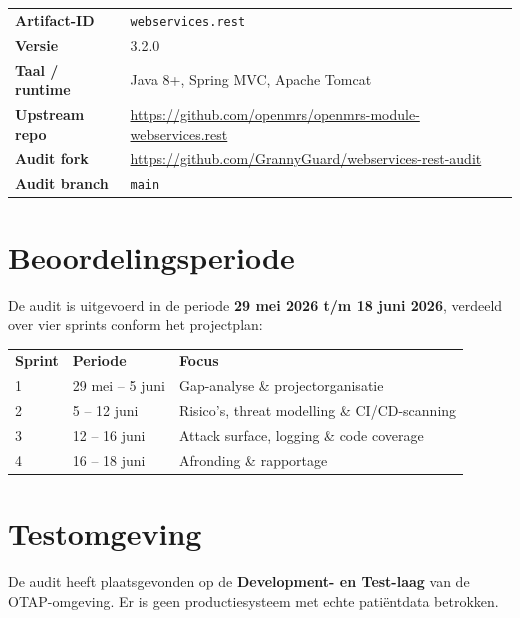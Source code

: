 \documentclass[12pt, a4paper]{report}
\begin{document}
\begin{tabular}{@{}ll}
    \textbf{Artifact-ID}    & \texttt{webservices.rest} \\[4pt]
    \textbf{Versie}         & 3.2.0 \\[4pt]
    \textbf{Taal / runtime} & Java 8+, Spring MVC, Apache Tomcat \\[4pt]
    \textbf{Upstream repo}  & \url{https://github.com/openmrs/openmrs-module-webservices.rest} \\[4pt]
    \textbf{Audit fork}     & \url{https://github.com/GrannyGuard/webservices-rest-audit} \\[4pt]
    \textbf{Audit branch}   & \texttt{main} \\
\end{tabular}

\section{Beoordelingsperiode}
\label{sec:periode}

De audit is uitgevoerd in de periode \textbf{29 mei 2026 t/m 18 juni 2026},
verdeeld over vier sprints conform het projectplan:

\begin{tabular}{@{}lll}
    \textbf{Sprint} & \textbf{Periode} & \textbf{Focus} \\[4pt]
    1 & 29 mei -- 5 juni  & Gap-analyse \& projectorganisatie \\[2pt]
    2 & 5 -- 12 juni      & Risico's, threat modelling \& CI/CD-scanning \\[2pt]
    3 & 12 -- 16 juni     & Attack surface, logging \& code coverage \\[2pt]
    4 & 16 -- 18 juni     & Afronding \& rapportage \\
\end{tabular}

\section{Testomgeving}
\label{sec:testomgeving}

De audit heeft plaatsgevonden op de \textbf{Development- en Test-laag} van de
OTAP-omgeving. Er is geen productiesysteem met echte patiëntdata betrokken.
\end{document}
